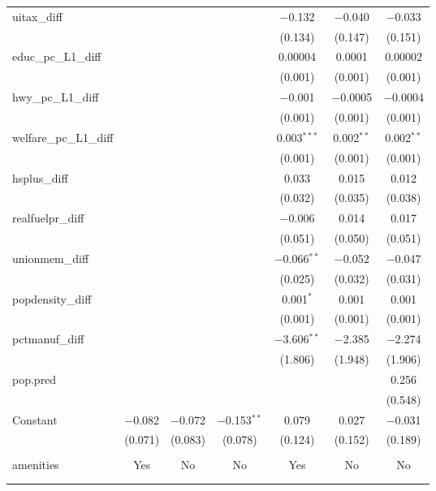 \begin{table}[!htbp]
\begin{tabular}{@{\extracolsep{5pt}}lcccccc}
  uitax\_diff &  &  &  & $-$0.132 & $-$0.040 & $-$0.033 \\ 
  &  &  &  & (0.134) & (0.147) & (0.151) \\ 
  educ\_pc\_L1\_diff &  &  &  & 0.00004 & 0.0001 & 0.00002 \\ 
  &  &  &  & (0.001) & (0.001) & (0.001) \\ 
  hwy\_pc\_L1\_diff &  &  &  & $-$0.001 & $-$0.0005 & $-$0.0004 \\ 
  &  &  &  & (0.001) & (0.001) & (0.001) \\ 
  welfare\_pc\_L1\_diff &  &  &  & 0.003$^{***}$ & 0.002$^{**}$ & 0.002$^{**}$ \\ 
  &  &  &  & (0.001) & (0.001) & (0.001) \\ 
  hsplus\_diff &  &  &  & 0.033 & 0.015 & 0.012 \\ 
  &  &  &  & (0.032) & (0.035) & (0.038) \\ 
  realfuelpr\_diff &  &  &  & $-$0.006 & 0.014 & 0.017 \\ 
  &  &  &  & (0.051) & (0.050) & (0.051) \\ 
  unionmem\_diff &  &  &  & $-$0.066$^{**}$ & $-$0.052 & $-$0.047 \\ 
  &  &  &  & (0.025) & (0.032) & (0.031) \\ 
  popdensity\_diff &  &  &  & 0.001$^{*}$ & 0.001 & 0.001 \\ 
  &  &  &  & (0.001) & (0.001) & (0.001) \\ 
  pctmanuf\_diff &  &  &  & $-$3.606$^{**}$ & $-$2.385 & $-$2.274 \\ 
  &  &  &  & (1.806) & (1.948) & (1.906) \\ 
  pop.pred &  &  &  &  &  & 0.256 \\ 
  &  &  &  &  &  & (0.548) \\ 
  Constant & $-$0.082 & $-$0.072 & $-$0.153$^{**}$ & 0.079 & 0.027 & $-$0.031 \\ 
  & (0.071) & (0.083) & (0.078) & (0.124) & (0.152) & (0.189) \\ 
 \hline \\[-1.8ex] 
amenities & Yes & No & No & Yes & No & No \\ 
\hline \\[-1.8ex] 
\hline 
\hline \\[-1.8ex] 
\end{tabular} 
\end{table} 
